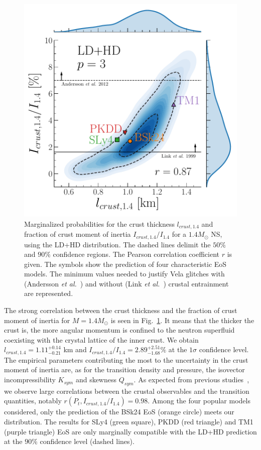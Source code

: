 \begin{figure}[!t]
  \begin{center}
    \includegraphics[width=0.8\linewidth]{figures/ifrac14_vs_lcrust14.pdf}
  \end{center}
  \caption[Marginalized probabilities for the crust thickness and fraction of
  crust moment of inertia of a $1.4M_\odot$]{Marginalized probabilities for the 
    crust thickness $l_{crust,1.4}$ and fraction of crust moment of inertia
    $I_{crust,1.4}/I_{1.4}$ for a $1.4M_\odot$ NS, using the LD+HD 
    distribution. The dashed lines delimit the $50\%$ and $90\%$ confidence 
    regions. The Pearson correlation coefficient $r$ is given. The symbols
    show the prediction of four characteristic EoS 
    models. The minimum values needed to justify Vela glitches with (Andersson 
    \textit{et al.}~\cite{Andersson2012}) and without (Link \textit{et
  al.}~\cite{Link1999}) crustal entrainment are 
represented.}\label{fig:ifrac14_vs_lcrust14}
\end{figure}

The strong correlation between the crust thickness and the fraction of crust 
moment of inertia for $M=1.4M_\odot$ is seen in
Fig.~\ref{fig:ifrac14_vs_lcrust14}. It means that the thicker the crust is, 
the more angular momentum is confined to the neutron superfluid coexisting with 
the crystal lattice of the inner crust. We obtain 
$l_{crust,1.4}=1.11_{-0.21}^{+0.14}$ km and $I_{crust,1.4}/I_{1.4}=
2.89_{-1.68}^{+2.51} \%$ at the $1\sigma$ confidence level. The empirical 
parameters contributing the most to the uncertainty in the crust moment of 
inertia are, as for the transition density and pressure, the isovector 
incompressibility $K_{sym}$ and skewness $Q_{sym}$. As expected from previous 
studies~\cite{Piekarewicz2014,Carreau2019moi}, we observe large correlations 
between the crustal observables and the transition quantities, notably 
$r(P_t,I_{crust,1.4}/I_{1.4})=0.98$. Among the four popular models considered, 
only the prediction of the BSk24 EoS (orange circle) meets our distribution.
The results for SLy4 (green square), PKDD (red triangle) and TM1 (purple
triangle) EoS are only marginally compatible with the LD+HD prediction at the 
$90\%$ confidence level (dashed lines).


